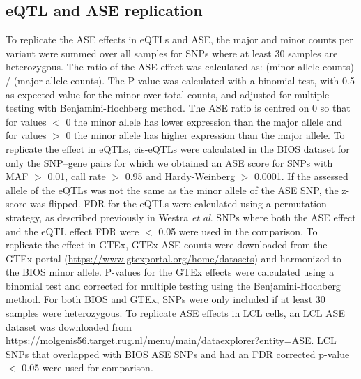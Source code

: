 \subsection{eQTL and ASE replication}
To replicate the ASE effects in eQTLs and ASE, the major and minor counts per variant were summed over all samples for SNPs where at least 30 samples are heterozygous. The ratio of the ASE effect was calculated as: (minor allele counts) / (major allele counts). The P-value was calculated with a binomial test, with 0.5 as expected value for the minor over total counts, and adjusted for multiple testing with Benjamini-Hochberg method\cite{benjaminiControllingFalseDiscovery1995}. The ASE ratio is centred on 0 so that for values $<$ 0 the minor allele has lower expression than the major allele and for values $>$ 0 the minor allele has higher expression than the major allele.
To replicate the effect in eQTLs, cis-eQTLs were calculated in the BIOS dataset for only the SNP–gene pairs for which we obtained an ASE score for SNPs with MAF $>$ 0.01, call rate $>$ 0.95 and Hardy-Weinberg $>$ 0.0001. If the assessed allele of the eQTLs was not the same as the minor allele of the ASE SNP, the z-score was flipped. FDR for the eQTLs were calculated using a permutation strategy, as described previously in Westra \textit{et al}.\cite{westraSystematicIdentificationTrans2013} SNPs where both the ASE effect and the eQTL effect FDR were $<$ 0.05 were used in the comparison.
To replicate the effect in GTEx, GTEx ASE counts were downloaded from the GTEx portal (\url{https://www.gtexportal.org/home/datasets}) and harmonized to the BIOS minor allele. P-values for the GTEx effects were calculated using a binomial test and corrected for multiple testing using the Benjamini-Hochberg method. For both BIOS and GTEx, SNPs were only included if at least 30 samples were heterozygous.
To replicate ASE effects in LCL cells, an LCL ASE dataset\cite{deelenCallingGenotypesPublic2015} was downloaded from \url{https://molgenis56.target.rug.nl/menu/main/dataexplorer?entity=ASE}. LCL SNPs that overlapped with BIOS ASE SNPs and had an FDR corrected p-value $<$ 0.05 were used for comparison.

